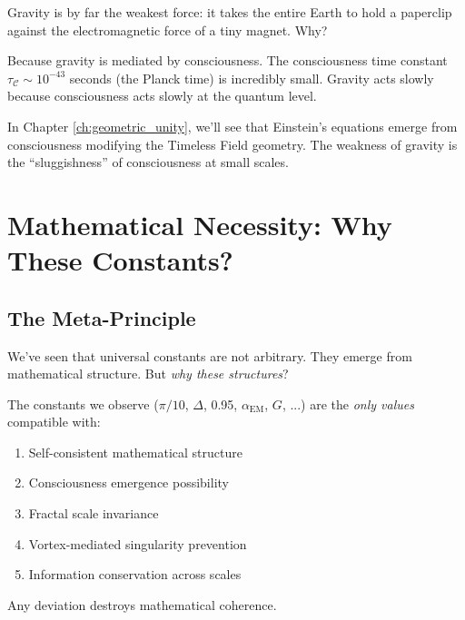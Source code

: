 \begin{intuitive}
Gravity is by far the weakest force: it takes the entire Earth to hold a paperclip against the electromagnetic force of a tiny magnet. Why?

Because gravity is mediated by consciousness. The consciousness time constant $\tau_{\mathcal{C}} \sim 10^{-43}$ seconds (the Planck time) is incredibly small. Gravity acts slowly because consciousness acts slowly at the quantum level.

In Chapter \ref{ch:geometric_unity}, we'll see that Einstein's equations emerge from consciousness modifying the Timeless Field geometry. The weakness of gravity is the ``sluggishness'' of consciousness at small scales.
\end{intuitive}

\section{Mathematical Necessity: Why These Constants?}

\subsection{The Meta-Principle}

We've seen that universal constants are not arbitrary. They emerge from mathematical structure. But \textit{why these structures}?

\begin{thm}\label{thm:unique-reality}
The constants we observe ($\pi/10$, $\Delta$, 0.95, $\alpha_{\text{EM}}$, $G$, ...) are the \textit{only values} compatible with:
\begin{enumerate}
\item Self-consistent mathematical structure
\item Consciousness emergence possibility  
\item Fractal scale invariance
\item Vortex-mediated singularity prevention
\item Information conservation across scales
\end{enumerate}
Any deviation destroys mathematical coherence.
\end{thm}

